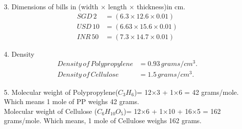 \documentclass[11pt]{exam}
\begin{document}
\begin{questions}
                 3. Dimensions of bills in (width $\times$ length $\times$ thickness)in cm.
                 \begin{align*}
                 SGD\, 2 &= (6.3 \times 12.6 \times 0.01) \\
                 USD\, 10 &= (6.63 \times 15.6 \times 0.01)\\
                 INR\, 50 &= (7.3 \times 14.7 \times 0.01)   
                 \end{align*}                
                            
                 4. Density
                    \begin{align*} Density\, of\, Polypropylene &= 0.93\, grams/cm^{3}.\\              
                    Density\, of\, Cellulose &= 1.5\,grams/cm^{3}.
                    \end{align*}
                    
                 
                 5. Molecular weight of Polypropylene($C_{3}H_{6}$)= 12$\times$3 + 1$\times$6 = 42 grams/mole. Which means 1 mole of PP weighs 42 grams. \\
                 
                 Molecular weight of Cellulose ($C_{6}H_{10}O_{5}$)= 12$\times$6 + 1$\times$10 + 16$\times$5 = 162 grams/mole. Which means, 1 mole of Cellulose weighs 162 grams. \\ \\


\end{questions}
\end{document}
